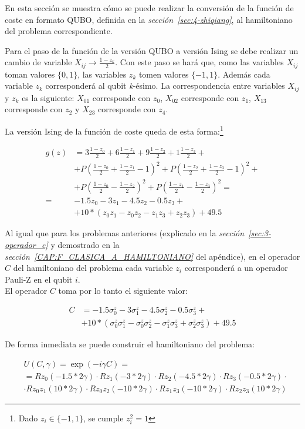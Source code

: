 En esta sección se muestra cómo se puede realizar la conversión de la función de coste en formato QUBO, definida en la \textit{sección~\ref{sec:4-zhiqiang}}, al hamiltoniano del problema correspondiente.

Para el paso de la función de la versión QUBO a versión Ising se debe realizar un cambio de variable $X_{ij} \rightarrow \frac{1 - z_k}{2}$.
Con este paso se hará que, como las variables $X_{ij}$ toman valores $\{0, 1\}$, las variables $z_k$ tomen valores $\{-1, 1\}$.
Además cada variable $z_k$ corresponderá al qubit \textit{k}-ésimo.
La correspondencia entre variables $X_{ij}$ y $z_k$ es la siguiente:
$X_{01}$ corresponde con $z_0$,
$X_{02}$ corresponde con $z_1$,
$X_{13}$ corresponde con $z_2$ y
$X_{23}$ corresponde con $z_4$.

La versión Ising de la función de coste queda de esta forma:\footnote{Dado $z_i \in \{-1, 1\}$, se cumple $z_i^2 = 1$}

\begin{align}
  g(z) &= 3\frac{1 - z_0}{2} + 6\frac{1 - z_1}{2} + 9\frac{1 - z_2}{2} + 1\frac{1 - z_3}{2} + \nonumber \\
       &+ P{(\frac{1 - z_0}{2} + \frac{1 - z_1}{2} - 1)}^2 + P{(\frac{1 - z_2}{2} + \frac{1 - z_3}{2} - 1)}^2 + \nonumber \\
       &+ P{(\frac{1 - z_0}{2} - \frac{1 - z_2}{2})}^2 + P{(\frac{1 - z_1}{2} - \frac{1 - z_3}{2})}^2 = \nonumber \\
  = &  -1.5z_0 - 3z_1 - 4.5z_2 - 0.5z_3 + \nonumber \\
       &+ 10*(z_0z_1 - z_0z_2 - z_1z_3 + z_2z_3) + 49.5
\end{align}

Al igual que para los problemas anteriores (explicado en la \textit{sección~\ref{sec:3-operador_c}} y demostrado en la \textit{sección~\ref{CAP:F_CLASICA_A_HAMILTONIANO}} del apéndice), en el operador $C$ del hamiltoniano del problema cada variable $z_i$ corresponderá a un operador Pauli-Z en el qubit $i$.
\\
El operador $C$ toma por lo tanto el siguiente valor:

\begin{align}
  C &= -1.5\sigma^z_0 - 3\sigma^z_1 - 4.5\sigma^z_2 - 0.5\sigma^z_3 + \nonumber \\
    &+ 10*(\sigma^z_0\sigma^z_1 - \sigma^z_0\sigma^z_2 - \sigma^z_1\sigma^z_3 + \sigma^z_2\sigma^z_3) + 49.5
\end{align}

De forma inmediata se puede construir el hamiltoniano del problema:

\begin{align}
  &U(C, \gamma) = \exp(-i \gamma C) = \nonumber \\
  &= Rz_0(-1.5 * 2\gamma) \cdot Rz_1(-3 * 2\gamma) \cdot Rz_2(-4.5 * 2\gamma) \cdot Rz_3(-0.5 * 2\gamma) \cdot \nonumber \\
  &\cdot Rz_0z_1(10 * 2\gamma) \cdot Rz_0z_2(-10 * 2\gamma) \cdot Rz_1z_3(-10 * 2\gamma) \cdot Rz_2z_3(10 * 2\gamma)
\end{align}


